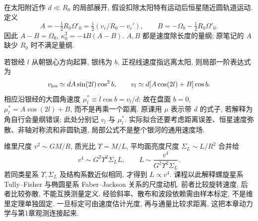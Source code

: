 在太阳附近作 $d\ll R_0$ 的局部展开, 假设扣除太阳特有运动后恒星随近圆轨道运动. 定义
\[
A=-\tfrac12R_0\Omega'_0=\tfrac12(v_c/R_0-v_c'),
\qquad B=-\Omega_0-\tfrac12R_0\Omega'_0.
\]
因此 $A-B=\Omega_0$, $\kappa_0^2=-4B(A-B)$. $A,B$ 都是速度除长度的量纲; 原笔记的 $A$ 缺少 $R_0$ 时不满足量纲.

若银经 $l$ 从朝银心方向起算, 银纬为 $b$, 正视线速度指远离太阳, 则局部一阶表达式为
\[
v_{\rm los}\simeq dA\sin(2l)\cos^2b,\qquad
v_l\simeq d[A\cos(2l)+B]\cos b.
\]
相应沿银经的大圆角速度 $\mu_l^*\equiv\dot l\cos b=v_l/d$; 故在盘面 $b=0$, $\mu_l^*=A\cos(2l)+B$, 而不是再乘一个距离. 原课用 $\mu$ 表示带 $d$ 的式子, 若解释为角自行会量纲错误; 此处分别记 $v_l$ 与 $\mu_l^*$. 实际拟合还要考虑距离误差、恒星速度弥散、非轴对称流和非圆轨道, 局部公式不是整个银河的通用速度场.

维里尺度 $v^2\sim GM/R$, 质光比 $\Upsilon=M/L$, 平均面亮度尺度 $\Sigma_L\sim L/R^2$ 合并给
\[
v^4\sim G^2\Upsilon^2\Sigma_LL,\qquad
L\sim\frac{v^4}{G^2\Upsilon^2\Sigma_L}.
\]
若同类星系 $\Upsilon,\Sigma_L$ 及结构系数近似相同, 才得到 $L\propto v^4$. 课程以此解释螺旋星系 Tully--Fisher 与椭圆星系 Faber--Jackson 关系的尺度动机. 前者比较旋转速度, 后者比较弥散, 不能互换测量定义. 经验斜率、散布和波段依赖需由样本标定, 不是维里定理单独固定. 一旦标定可由速度估计光度, 再与通量比较求距离, 这把本章动力学与第1章观测连接起来.
